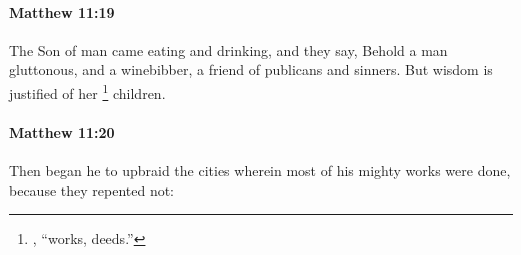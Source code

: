 		\paragraph{Matthew 11:19} %
			\label{MATTHEW-11-19}

			The Son of man came eating and drinking, and they say, Behold a man gluttonous, and a winebibber, a friend of publicans and sinners. But wisdom is justified of her
				\footnote{%
					, ``works, deeds.''
					}%
			children.

			\begin{framed}
			\scriptsize
				\begin{compactdesc}
					\item[SBLG] 
				\end{compactdesc}
			\end{framed}

		\paragraph{Matthew 11:20} %
			\label{MATTHEW-11-20}

			Then began he to upbraid the cities wherein most of his mighty works were done, because they repented not:


